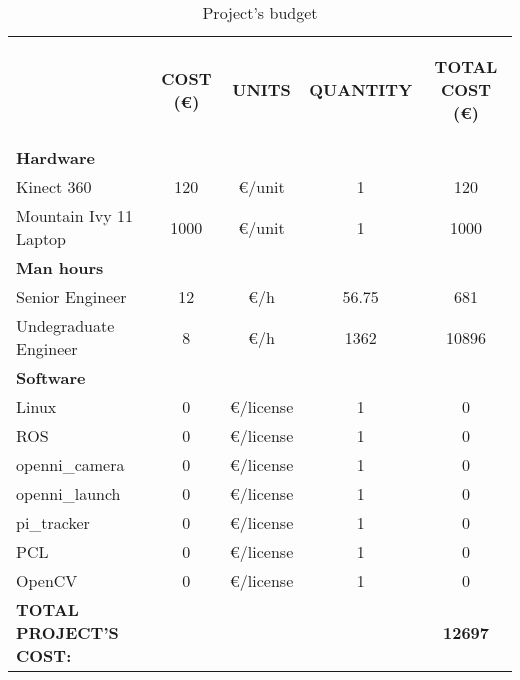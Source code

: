\begin{table}[H]
\centering
\begin{tabular} {l c c c c}
\toprule
\addlinespace[3mm]
   \multicolumn{1}{c}{\begin{center}\textbf{ITEM}\end{center}} &
   \multicolumn{1}{c}{\begin{center}\textbf{COST (\euro)}\end{center}} &
   \multicolumn{1}{c}{\begin{center}\textbf{UNITS}\end{center}} &
   \multicolumn{1}{c}{\begin{center}\textbf{QUANTITY}\end{center}} &
   \multicolumn{1}{c}{\begin{center}\textbf{TOTAL COST (\euro)}\end{center}} &
\\
\addlinespace[-3mm]
\midrule
\textbf{Hardware}	&&&&		\\					
\hspace*{0.5cm}	Kinect 360	&	120	&	\euro/unit	&	1 	&	120 \\
\hspace*{0.5cm}	Mountain Ivy 11 Laptop	&	1000	&	\euro/unit	&	1	&	1000\\		
\textbf{Man hours}													&&&&		\\		
\hspace*{0.5cm}	Senior Engineer 	&	12	&\euro/h	&	56.75	&	681\\
\hspace*{0.5cm}	Undegraduate Engineer	&	8	&	\euro/h		&	1362	&	10896 \\
						
\textbf{Software}			&&&&		\\						
						
\hspace*{0.5cm}	Linux	&	0 &	\euro/license	&	1	&	0\\
\hspace*{0.5cm}	ROS	&	0	&\euro/license&	1	&0\\
\hspace*{0.8cm}		openni\_camera	&	0	&	\euro/license	&1&		0\\
\hspace*{0.8cm}		openni\_launch	&	0	&	\euro/license	&1&	0\\
\hspace*{0.8cm}		pi\_tracker 		&	0	&	\euro/license	&1&	0\\
\hspace*{0.5cm}	PCL		&	0	&	\euro/license	&	1	&	0\\
\hspace*{0.5cm}	OpenCV	&	0	&	\euro/license	&	1	&	0\\
						
\midrule

\textbf{TOTAL PROJECT'S COST: }			&&&&			\textbf{12697}\\

\bottomrule
\end{tabular}
\caption[Project's budget]{Project's budget}
\label{budget}

\end{table}


